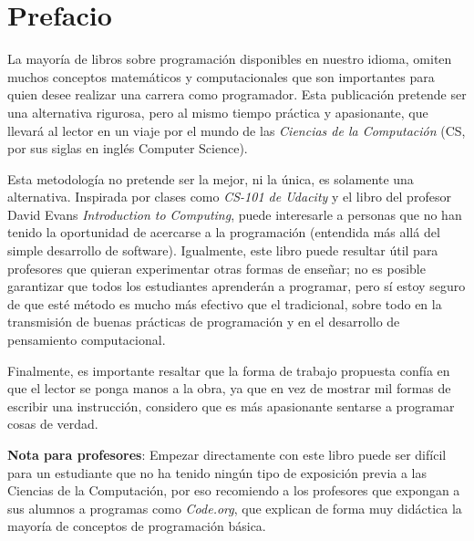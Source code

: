 \thispagestyle{empty}

\chapter{Prefacio}
    La mayoría de libros sobre programación disponibles en nuestro idioma, omiten muchos conceptos matemáticos y computacionales que son importantes para quien desee realizar una carrera como programador. Esta publicación pretende ser una alternativa rigurosa, pero al mismo tiempo práctica y apasionante, que llevará al lector en un viaje por el mundo de las \emph{Ciencias de la Computación} (CS, por sus siglas en inglés Computer Science).    
    
    Esta metodología no pretende ser la mejor, ni la única, es solamente una alternativa. Inspirada por clases como \emph{CS-101 de Udacity} y el libro del profesor David Evans \emph{Introduction to Computing}, puede interesarle a personas que no han tenido la oportunidad de acercarse a la programación (entendida más allá del simple desarrollo de software). Igualmente, este libro puede resultar útil para profesores que quieran experimentar otras formas de enseñar; no es posible  garantizar que todos los estudiantes aprenderán a programar, pero sí estoy seguro de que esté método es mucho más efectivo que el tradicional, sobre todo en la transmisión de buenas prácticas de programación y en el desarrollo de pensamiento computacional.
    
    Finalmente, es importante resaltar que la forma de trabajo propuesta confía en que el lector se ponga manos a la obra, ya que en vez de mostrar mil formas de escribir una instrucción, considero que es más apasionante sentarse a programar cosas de verdad.
     
    \newpage
    \thispagestyle{empty}
        \textbf{Nota para profesores}: Empezar directamente con este libro puede ser difícil para un estudiante que no ha tenido ningún tipo de exposición previa a las Ciencias de la Computación, por eso recomiendo a los profesores que expongan a sus alumnos a programas como \emph{Code.org}, que explican de forma muy didáctica la mayoría de conceptos de programación básica.
      
    
  
    
 